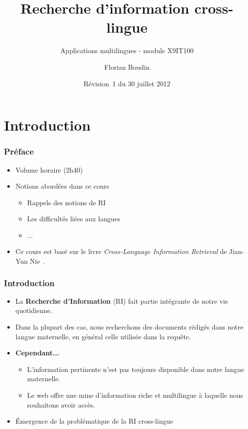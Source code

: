 \documentclass[12pt,aspectratio=43,dvipsnames,table]{beamer}
\title{Recherche d'information cross-lingue}
\subtitle{Applications multilingues - module X9IT100}
\author{Florian Boudin}
\institute{Département informatique, Université de Nantes}
\date[30 juillet 2013 / Rév.~1]{Révision~1 du 30 juillet 2012}
\begin{document}
\frame[plain]{\titlepage}


\section{Introduction}


\begin{frame}
    \frametitle{Préface}
    \begin{itemize} \itemsep10pt
        \item Volume horaire (2h40)
        \item Notions abordées dans ce cours
        \begin{itemize}
            \item Rappels des notions de RI
            \item Les difficultés liées aux langues
            \item ...
        \end{itemize}
        \item Ce cours est basé sur le livre \textit{Cross-Language Information 
              Retrieval} de Jian-Yun Nie~\cite{DBLP:series/synthesis/2010Nie}.
    \end{itemize}
\end{frame}


\begin{frame}
    \frametitle{Introduction}
    \begin{itemize} \itemsep10pt
        \item La \textbf{Recherche d'Information} (RI) fait partie intégrante de
              notre vie quotidienne.
        \item Dans la plupart des cas, nous recherchons des documents rédigés 
              dans notre langue maternelle, en général celle utilisée dans la 
              requête.
        \item \textbf{Cependant...}
        \begin{itemize}
            \item L'information pertinente n'est pas toujours disponible dans 
                  notre langue maternelle.
            \item Le web offre une mine d'information riche et multilingue à 
                  laquelle nous souhaitons avoir accès.
        \end{itemize}
        \item \'Emergence de la problématique de la RI cross-lingue
    \end{itemize}
\end{frame}
\end{document}
